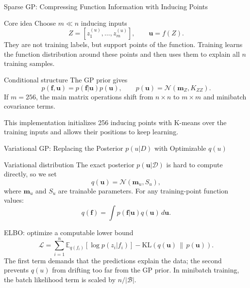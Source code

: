 \documentclass[aspectratio=169,11pt]{beamer}
\begin{document}
\begin{frame}{Sparse GP: Compressing Function Information with Inducing Points}
\small
\begin{block}{Core idea}
\footnotesize
Choose \(m\ll n\) inducing inputs
\[
Z=[z_1^{(u)},\ldots,z_m^{(u)}],
\qquad
\mathbf u=f(Z).
\]
They are not training labels, but support points of the function. Training learns the function distribution around
these points and then uses them to explain all \(n\) training samples.
\end{block}

\begin{block}{Conditional structure}
\footnotesize
The GP prior gives
\[
p(\mathbf f,\mathbf u)=p(\mathbf f|\mathbf u)p(\mathbf u),
\qquad
p(\mathbf u)=\mathcal N(\mathbf m_Z,K_{ZZ}).
\]
If \(m=256\), the main matrix operations shift from \(n\times n\) to \(m\times m\) and minibatch covariance terms.
\end{block}

\footnotesize
This implementation initializes 256 inducing points with K-means over the training inputs and allows their positions
to keep learning.
\end{frame}

\begin{frame}{Variational GP: Replacing the Posterior \(p(u|D)\) with Optimizable \(q(u)\)}
\small
\begin{block}{Variational distribution}
\footnotesize
The exact posterior \(p(\mathbf u|\mathcal D)\) is hard to compute directly, so we set
\[
q(\mathbf u)=\mathcal N(\mathbf m_u,S_u),
\]
where \(\mathbf m_u\) and \(S_u\) are trainable parameters. For any training-point function values:
\[
q(\mathbf f)=\int p(\mathbf f|\mathbf u)q(\mathbf u)\,d\mathbf u.
\]
\end{block}

\begin{block}{ELBO: optimize a computable lower bound}
\footnotesize
\[
\mathcal L
=
\sum_{i=1}^{n}
\mathbb E_{q(f_i)}[\log p(z_i|f_i)]
-\mathrm{KL}\!\left(q(\mathbf u)\,\|\,p(\mathbf u)\right).
\]
The first term demands that the predictions explain the data; the second prevents \(q(u)\) from drifting too far
from the GP prior. In minibatch training, the batch likelihood term is scaled by \(n/|\mathcal B|\).
\end{block}
\end{frame}
\end{document}
